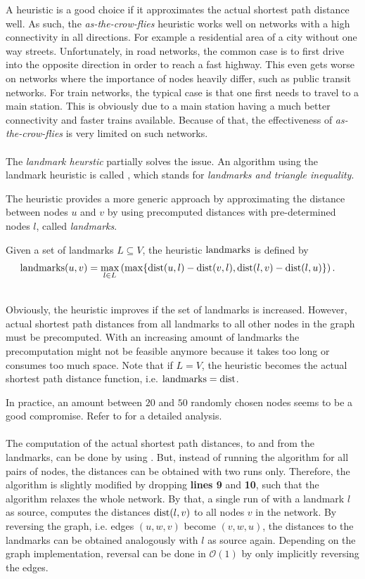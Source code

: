 	A heuristic is a good choice if it approximates the actual shortest path distance well. As such, the \textit{as-the-crow-flies} heuristic works well
	on networks with a high connectivity in all directions. For example a residential area of a city without one way streets. Unfortunately, in road
	networks, the common case is to first drive into the opposite direction in order to reach a fast highway. This even gets worse on networks
	where the importance of nodes heavily differ, such as public transit networks. For train networks, the typical case is that one first needs
	to travel to a main station. This is obviously due to a main station having a much better connectivity and faster trains available.
	Because of that, the effectiveness of \textit{as-the-crow-flies} is very limited on such networks.\\\\
	The \textit{landmark heurstic} partially solves the issue. An \astar algorithm using the landmark heuristic is called \alt {},
	which stands for \textit{landmarks and triangle inequality}.
	
	The heuristic provides a more generic approach by approximating the distance
	between nodes $u$ and $v$ by using precomputed distances with pre-determined nodes $l$, called \textit{landmarks}.
	\begin{mydef}
		Given a set of landmarks $L \subseteq V$, the heuristic $\operatorname{landmarks}$ is defined by
		\begin{align*}
			\operatorname{landmarks}(u, v)	&= \max_{l \in L} \left(\max \{\operatorname{dist}(u, l) - \operatorname{dist}(v, l), \operatorname{dist}(l, v) - \operatorname{dist}(l, u)\}\right).
		\end{align*}
	\end{mydef}\quad\\
	Obviously, the heuristic improves if the set of landmarks is increased. However, actual shortest path distances from all landmarks
	to all other nodes in the graph must be precomputed. With an increasing amount of landmarks the precomputation might not
	be feasible anymore because it takes too long or consumes too much space. Note that if $L = V$, the heuristic becomes the
	actual shortest path distance function, i.e. $\operatorname{landmarks} = \operatorname{dist}$.
	
	In practice, an amount between $20$ and $50$ randomly chosen nodes seems to be a good compromise.
	Refer to  for a detailed analysis.\\\\
	The computation of the actual shortest path distances, to and from the landmarks, can be done by using \dijkstra. But, instead of
	running the algorithm for all pairs of nodes, the distances can be obtained with two runs only. Therefore, the algorithm is slightly modified by dropping
	\textbf{lines 9} and \textbf{10}, such that the algorithm relaxes the whole network. By that, a single run of \dijkstra with a landmark $l$ as source,
	computes the distances $\operatorname{dist}(l, v)$ to all nodes $v$ in the network. By reversing the graph, i.e. edges $(u, w, v)$ become $(v, w, u)$, the distances to
	the landmarks can be obtained analogously with $l$ as source again. Depending on the graph implementation, reversal can be done
	in $\mathcal{O}(1)$ by only implicitly reversing the edges.

